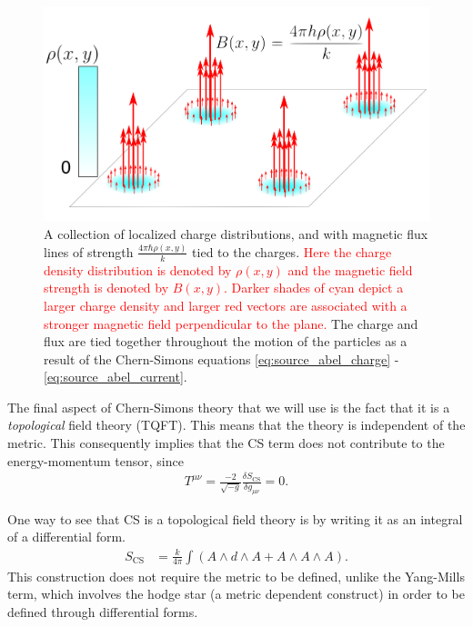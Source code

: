\begin{figure}[htb]
	\centering
		\includegraphics[scale=0.17]{Background_Folder/figures/flux_attachment_improved.pdf}
    \caption[\textcolor{red}{This figure depicts magnetic flux attachment}]{A collection of localized charge distributions, and with magnetic flux lines of strength $\frac{4 \pi \hbar \rho(x,y)}{k}$ tied to the charges. \textcolor{red}{Here the charge density distribution is denoted by $\rho(x,y)$ and the magnetic field strength is denoted by $B(x,y)$. Darker shades of cyan depict a larger charge density and larger red vectors are associated with a stronger magnetic field perpendicular to the plane.}  The charge and flux are tied together throughout the motion of the particles as a result of the Chern-Simons equations \eqref{eq:source_abel_charge} - \eqref{eq:source_abel_current}.} \label{fig:flux_attachment}
\end{figure}

The final aspect of Chern-Simons theory that we will use is the fact that it is a \textit{topological} field theory (TQFT). This means that the theory is independent of the metric. This consequently implies that the CS term does not contribute to the energy-momentum tensor, since
\begin{align}
    T^{\mu \nu} = \frac{-2}{ \sqrt{-g}} \frac{\delta S_{\text{CS}}}{ \delta g_{\mu\nu}} =0.
\end{align}

One way to see that CS is a topological field theory is by writing it as an integral of a differential form.
\begin{align}
    S_{\text{CS}} &= \frac{k}{4 \pi} \int \left(A \wedge d \wedge A +A \wedge A \wedge A\right).
\end{align}
This construction does not require the metric to be defined, unlike the Yang-Mills term, which involves the hodge star (a metric dependent construct) in order to be defined through differential forms.

